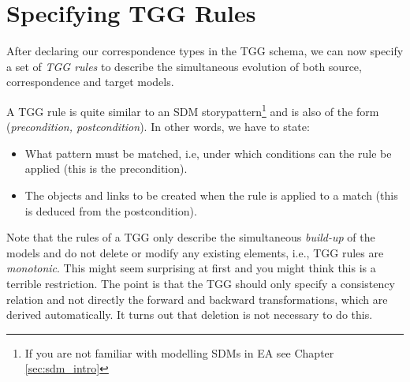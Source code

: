 \section{Specifying TGG Rules}

After declaring our correspondence types in the TGG schema, we can now specify a set of \emph{TGG rules} to describe the simultaneous evolution of both source, correspondence and target models.

A TGG rule is quite similar to an SDM storypattern\footnote{If you are not familiar with modelling SDMs in EA see Chapter \ref{sec:sdm_intro}} and is also of the form (\emph{precondition, postcondition}).
In other words, we have to state:
\begin{itemize}
  \item What pattern must be matched, i.e, under which conditions can the rule be applied (this is the precondition).
  \item The objects and links to be created when the rule is applied to a match (this is deduced from the postcondition). 
\end{itemize}

Note that the rules of a TGG only describe the simultaneous \emph{build-up} of the models and do not delete or modify any existing elements, i.e., TGG rules are \emph{monotonic}.
This might seem surprising at first and you might think this is a terrible restriction.
The point is that the TGG should only specify a consistency relation and not directly the forward and backward transformations, which are derived automatically. 
It turns out that deletion is not necessary to do this.

